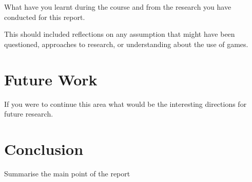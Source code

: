 \documentclass{article}
\begin{document}
What have you learnt during the course and from the research you have conducted for this report.

This should included reflections on any assumption that might have been questioned, approaches to research, or understanding about the use of games.


\section{Future Work}

If you were to continue this area what would be the interesting directions for future research. 

\section{Conclusion}
Summarise the main point of the report




\end{document}
